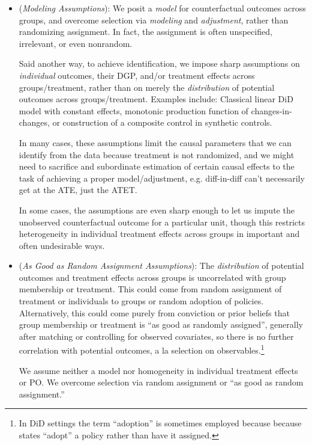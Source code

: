 \documentclass[12pt]{article}
\theoremstyle{plain}
\theoremstyle{definition}
\theoremstyle{remark}
\begin{document}
\begin{itemize}
  \item
    (\emph{Modeling Assumptions}):
    We posit a \emph{model} for counterfactual outcomes across
    groups, and overcome selection via \emph{modeling} and
    \emph{adjustment}, rather than randomizing assignment.
    In fact, the assignment is often unspecified, irrelevant, or
    even nonrandom.

    Said another way, to achieve identification, we impose sharp
    assumptions on \emph{individual} outcomes, their DGP, and/or
    treatment effects across groups/treatment, rather than on merely the
    \emph{distribution} of potential outcomes across groups/treatment.
    Examples include: Classical linear DiD model with constant effects,
    monotonic production function of changes-in-changes, or construction
    of a composite control in synthetic controls.

    In many cases, these assumptions limit the causal parameters
    that we can identify from the data because treatment is not
    randomized, and we might need to sacrifice and subordinate
    estimation of certain causal effects to the task of achieving a
    proper model/adjustment, e.g. diff-in-diff can't necessarily get at
    the ATE, just the ATET.

    In some cases, the assumptions are even sharp enough to let us
    impute the unobserved counterfactual outcome for a particular
    unit, though this restricts heterogeneity in individual treatment
    effects across groups in important and often undesirable ways.

  \item (\emph{As Good as Random Assignment Assumptions}):
    The \emph{distribution} of potential outcomes and treatment
    effects across groups is uncorrelated with group membership or
    treatment.
    This could come from random assignment of treatment or
    individuals to groups or random adoption of policies.
    Alternatively, this could come purely from conviction or prior
    beliefs that group membership or treatment is ``as good as
    randomly assigned'', generally after matching or controlling for
    observed covariates, so there is no further correlation with
    potential outcomes, a la selection on observables.\footnote{%
      In DiD settings the term ``adoption'' is sometimes employed
      because because states ``adopt'' a policy rather than have it
      assigned.
    }

    We assume neither a model nor homogeneity in individual treatment
    effects or PO.
    We overcome selection via random assignment or ``as good as random
    assignment.''
\end{itemize}
\end{document}
